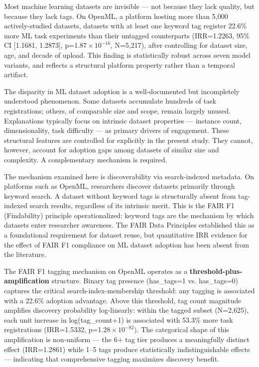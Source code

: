 
Most machine learning datasets are invisible --- not because they lack quality, but because they lack tags. On OpenML, a platform hosting more than 5,000 actively-studied datasets, datasets with at least one keyword tag register 22.6\% more ML task experiments than their untagged counterparts (IRR=1.2263, 95\% CI [1.1681, 1.2873], p=1.$87\times 10^{-16}$, N=5,217), after controlling for dataset size, age, and decade of upload. This finding is statistically robust across seven model variants, and reflects a structural platform property rather than a temporal artifact.

The disparity in ML dataset adoption is a well-documented but incompletely understood phenomenon. Some datasets accumulate hundreds of task registrations; others, of comparable size and scope, remain largely unused. Explanations typically focus on intrinsic dataset properties --- instance count, dimensionality, task difficulty --- as primary drivers of engagement. These structural features are controlled for explicitly in the present study. They cannot, however, account for adoption gaps among datasets of similar size and complexity. A complementary mechanism is required.

The mechanism examined here is discoverability via search-indexed metadata. On platforms such as OpenML, researchers discover datasets primarily through keyword search. A dataset without keyword tags is structurally absent from tag-indexed search results, regardless of its intrinsic merit. This is the FAIR F1 (Findability) principle operationalized: keyword tags are the mechanism by which datasets enter researcher awareness. The FAIR Data Principles \citep{Wilkinson2016FAIR} established this as a foundational requirement for dataset reuse, but quantitative IRR evidence for the effect of FAIR F1 compliance on ML dataset adoption has been absent from the literature.

The FAIR F1 tagging mechanism on OpenML operates as a \textbf{threshold-plus-amplification} structure. Binary tag presence (has\_tags=1 vs. has\_tags=0) captures the critical search-index-membership threshold: any tagging is associated with a 22.6\% adoption advantage. Above this threshold, tag count magnitude amplifies discovery probability log-linearly: within the tagged subset (N=2,625), each unit increase in log(tag\_count+1) is associated with 53.3\% more task registrations (IRR=1.5332, p=1.$28\times 10^{-82})$. The categorical shape of this amplification is non-uniform --- the 6+ tag tier produces a meaningfully distinct effect (IRR=1.2861) while 1--5 tags produce statistically indistinguishable effects --- indicating that comprehensive tagging maximizes discovery benefit.

